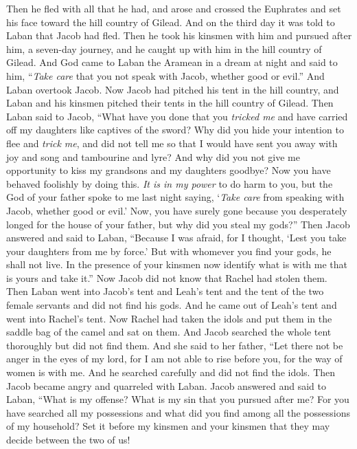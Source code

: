 \begin{biblechapter}
\verse Then he fled with all that he had, and arose and crossed the Euphrates and set his face toward the hill country of Gilead.
\verse And on the third day it was told to Laban that Jacob had fled.
\verse Then he took his kinsmen with him and pursued after him, a seven-day journey, and he caught up with him in the hill country of Gilead.
\verse And God came to Laban the Aramean in a dream at night and said to him, “\textit{Take care} that you not speak with Jacob, whether good or evil.”
\verse And Laban overtook Jacob. Now Jacob had pitched his tent in the hill country, and Laban and his kinsmen pitched their tents in the hill country of Gilead.
\verse Then Laban said to Jacob, “What have you done that you \textit{tricked me} and have carried off my daughters like captives of the sword?
\verse Why did you hide your intention to flee and \textit{trick me}, and did not tell me so that I would have sent you away with joy and song and tambourine and lyre?
\verse And why did you not give me opportunity to kiss my grandsons and my daughters goodbye? Now you have behaved foolishly by doing this.
\verse \textit{It is in my power} to do harm to you, but the God of your father spoke to me last night saying, ‘\textit{Take care} from speaking with Jacob, whether good or evil.’
\verse Now, you have surely gone because you desperately longed for the house of your father, but why did you steal my gods?”
\verse Then Jacob answered and said to Laban, “Because I was afraid, for I thought, ‘Lest you take your daughters from me by force.’
\verse But with whomever you find your gods, he shall not live. In the presence of your kinsmen now identify what is with me that is yours and take it.” Now Jacob did not know that Rachel had stolen them.
\verse Then Laban went into Jacob’s tent and Leah’s tent and the tent of the two female servants and did not find his gods. And he came out of Leah’s tent and went into Rachel’s tent.
\verse Now Rachel had taken the idols and put them in the saddle bag of the camel and sat on them. And Jacob searched the whole tent thoroughly but did not find them.
\verse And she said to her father, “Let there not be anger in the eyes of my lord, for I am not able to rise before you, for the way of women is with me. And he searched carefully and did not find the idols.
\verse Then Jacob became angry and quarreled with Laban. Jacob answered and said to Laban, “What is my offense? What is my sin that you pursued after me?
\verse For you have searched all my possessions and what did you find among all the possessions of my household? Set it before my kinsmen and your kinsmen that they may decide between the two of us!

\end{biblechapter}
